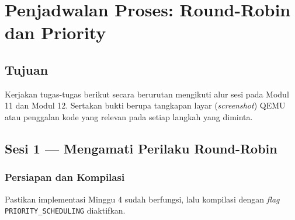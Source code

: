 
\chapter{Penjadwalan Proses: Round-Robin dan Priority}
\label{chap:handson-06}

\section{Tujuan}

Kerjakan tugas-tugas berikut secara berurutan mengikuti alur sesi pada Modul 11 dan Modul 12. Sertakan bukti berupa tangkapan layar (\textit{screenshot}) QEMU atau penggalan kode yang relevan pada setiap langkah yang diminta.

\section{Sesi 1 — Mengamati Perilaku Round-Robin}

\subsection{Persiapan dan Kompilasi}

Pastikan implementasi Minggu 4 sudah berfungsi, lalu kompilasi dengan \textit{flag} \texttt{PRIORITY\_SCHEDULING} diaktifkan.

